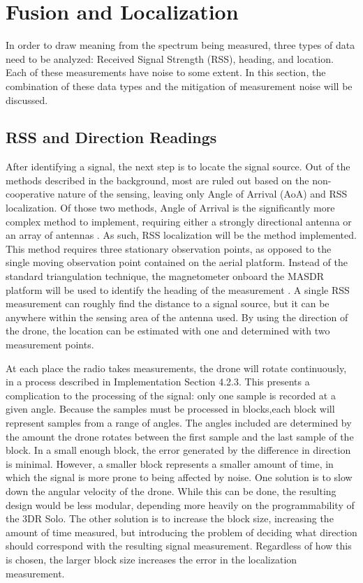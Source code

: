 \section{Fusion and Localization}
In order to draw meaning from the spectrum being measured, three types of data need to be analyzed: Received Signal Strength (RSS), heading, and location. Each of these measurements have noise to some extent. In this section, the combination of these data types and the mitigation of measurement noise will be discussed.\par  

\subsection{RSS and Direction Readings}
After identifying a signal, the next step is to locate the signal source. Out of the methods described in the background, most are ruled out based on the non-cooperative nature of the sensing, leaving only Angle of Arrival (AoA) and RSS localization. Of those two methods, Angle of Arrival is the significantly more complex method to implement, requiring either a strongly directional antenna or an array of antennas \cite{local_aoa}. As such, RSS localization will be the method implemented. This method requires three stationary observation points, as opposed to the single moving observation point contained on the aerial platform. Instead of the standard triangulation technique, the magnetometer onboard the MASDR platform will be used to identify the heading of the measurement \cite{rss_calc}. A single RSS measurement can roughly find the distance to a signal source, but it can be anywhere within the sensing area of the antenna used. By using the direction of the drone, the location can be estimated with one and determined with two measurement points.\par 
At each place the radio takes measurements, the drone will rotate continuously, in a process described in Implementation Section 4.2.3. This presents a complication to the processing of the signal: only one sample is recorded at a given angle. Because the samples must be processed in blocks,each block will represent samples from a range of angles. The angles included are determined by the amount the drone rotates between the first sample and the last sample of the block. In a small enough block, the error generated by the difference in direction is minimal. However, a smaller block represents a smaller amount of time, in which the signal is more prone to being affected by noise. One solution is to slow down the angular velocity of the drone. While this can be done, the resulting design would be less modular, depending more heavily on the programmability of the 3DR Solo. The other solution is to increase the block size, increasing the amount of time measured, but introducing the problem of deciding what direction should correspond with the resulting signal measurement. Regardless of how this is chosen, the larger block size increases the error in the localization measurement.\par 
